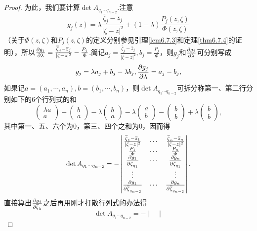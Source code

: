 \begin{proof}
	为此，我们要计算$\det A_{q_1\cdots q_{n-2}}$.注意
	\[g_j(z)=\lambda\frac{\bar{\zeta}_j-\bar{z}_j}{|\zeta-z|^2}+(1-\lambda)\frac{P_j(z,\zeta)}{\Phi(z,\zeta)}\]
	（关于$\Phi(z,\zeta)$和$P_j(z,\zeta)$的定义分别参见引理\ref{lem6.7.3}和定理\ref{thm6.7.4}的证明），所以$\frac{\partial g_j}{\partial \lambda}=\frac{{}\mkern1mu\overline{\mkern-1mu\zeta}_j-{}\mkern1mu\overline{\mkern-1muz}_j}{|\zeta-z|^2}-\frac{P_j}{\Phi}$.简记$a_j=\frac{\bar{\zeta}_j-\bar{z}_j}{|\zeta-z|^2},b_j=\frac{P_j}{\Phi}$，则$g_j$和$\frac{\partial g_j}{\partial \lambda}$可分别写成
	\[g_j=\lambda a_j+b_j-\lambda b_j,\frac{\partial g_j}{\partial \lambda}=a_j-b_j,\]
	如果记$a=(a_1,\cdots,a_n),b=(b_1,\cdots,b_n)$，则$\det A_{q_1\cdots q_{n-2}}$可拆分称第一、第二行分别如下的$6$个行列式的和
	\[\left(\begin{array}{c}
		\lambda a\\
		a
	\end{array}\right)+\left(\begin{array}{c}
	b\\
	a
	\end{array}\right)-\lambda\left(\begin{array}{c}
	b\\
	a
	\end{array}\right)-\lambda\left(\begin{array}{c}
	a\\
	b
	\end{array}\right)-\left(\begin{array}{c}
	b\\
	b
	\end{array}\right)+\lambda\left(\begin{array}{c}
	b\\
	b
	\end{array}\right),\]
	其中第一、五、六个为$0$，第三、四个之和为$0$，因而得
	\[\det A_{q_1\cdots q_{n-2}}=-\begin{vmatrix}
		\frac{{}\mkern1mu\overline{\mkern-1mu\zeta}_1-{}\mkern1mu\overline{\mkern-1muz}_1}{|\zeta-z|^2} & \cdots &\frac{{}\mkern1mu\overline{\mkern-1mu\zeta}_n-{}\mkern1mu\overline{\mkern-1muz}_n}{|\zeta-z|^2}\\
		\frac{P_1}{\Phi} & \cdots & \frac{P_n}{\Phi}\\
		\frac{\partial g_1}{\partial {}\mkern1mu\overline{\mkern-1mu\zeta}_{q_1}} & \cdots & \frac{\partial g_n}{\partial {}\mkern1mu\overline{\mkern-1mu\zeta}_{q_1}}\\
		\vdots & & \vdots\\
		\frac{\partial g_1}{\partial {}\mkern1mu\overline{\mkern-1mu\zeta}_{q_{n-2}}} & \cdots & \frac{\partial g_n}{\partial {}\mkern1mu\overline{\mkern-1mu\zeta}_{q_{n-2}}}
	\end{vmatrix}.\]
	直接算出$\frac{\partial g_j}{\partial {}\mkern1mu\overline{\mkern-1mu\zeta}_k}$之后再用刚才打散行列式的办法得
	\begin{equation}\label{eq6.7.13}
		\det A_{q_1\cdots q_{n-2}}=-\begin{vmatrix}

\end{vmatrix}
\end{equation}
\end{proof}
